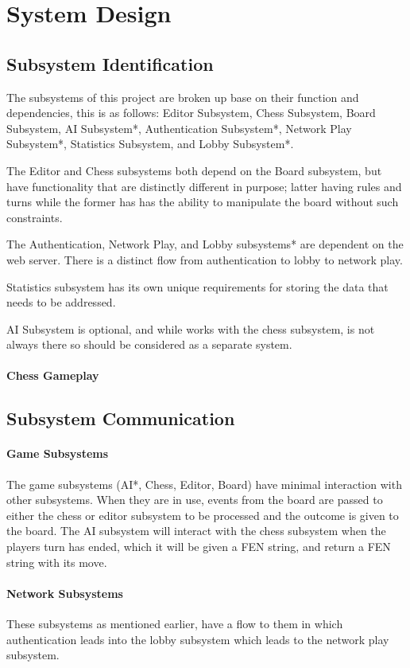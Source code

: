 \section{System Design}
\subsection{Subsystem Identification}
The subsystems of this project are broken up base on their function and dependencies, this is as follows: Editor Subsystem, Chess Subsystem, Board Subsystem, AI Subsystem*, Authentication Subsystem*, Network Play Subsystem*, Statistics Subsystem, and Lobby Subsystem*.

The Editor and Chess subsystems both depend on the Board subsystem, but have functionality that are distinctly different in purpose; latter having rules and turns while the former has has the ability to manipulate the board without such constraints.

The Authentication, Network Play, and Lobby subsystems* are dependent on the web server. There is a distinct flow from authentication to lobby to network play.

Statistics subsystem has its own unique requirements for storing the data that needs to be addressed.

AI Subsystem is optional, and while works with the chess subsystem, is not always there so should be considered as a separate system.

\paragraph{Chess Gameplay}
\subsection{Subsystem Communication}
\paragraph{Game Subsystems}
The game subsystems (AI*, Chess, Editor, Board) have minimal interaction with other subsystems. When they are in use, events from the board are passed to either the chess or editor subsystem to be processed and the outcome is given to the board. The AI subsystem will interact with the chess subsystem when the players turn has ended, which it will be given a FEN string, and return a FEN string with its move.

\paragraph{Network Subsystems}
These subsystems as mentioned earlier, have a flow to them in which authentication leads into the lobby subsystem which leads to the network play subsystem. 

